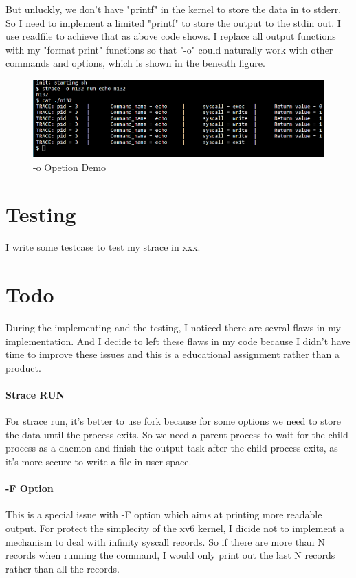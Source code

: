 \documentclass[11pt,oneside,a4paper]{article}
\begin{document}
But unluckly, we don't have "printf" in the kernel to store the data in to stderr.
So I need to implement a limited "printf" to store the output to the stdin out. 
I use readfile to achieve that as above code shows. I replace all output functions
with my "format print" functions so that "-o" could naturally work with other 
commands and options, which is shown in the beneath figure.

\begin{figure}[H]
    \includegraphics[width=4.75in]{1-35.png}
    \centering
    \caption{-o Opetion Demo}
\end{figure}

\section{Testing}

I write some testcase to test my strace in xxx.

\section{Todo}

During the implementing and the testing, I noticed there are sevral flaws in my 
implementation. And I decide to left these flaws in my code 
because I didn't have time to improve these issues and this is a educational assignment
rather than a product.

\paragraph*{Strace RUN}
For strace run, it's better to use fork because for some options we need to store the 
data until the process exits. So we need a parent process to wait for the child process 
as a daemon and finish the output task after the child process exits, as it's more 
secure to write a file in user space.

\paragraph*{-F Option}
This is a special issue with -F option which aims at printing more readable output.
For protect the simplecity of the xv6 kernel, I dicide not to implement a mechanism
to deal with infinity syscall records. So if there are more than N records when running
the command, I would only print out the last N records rather than all the records.
\end{document}
